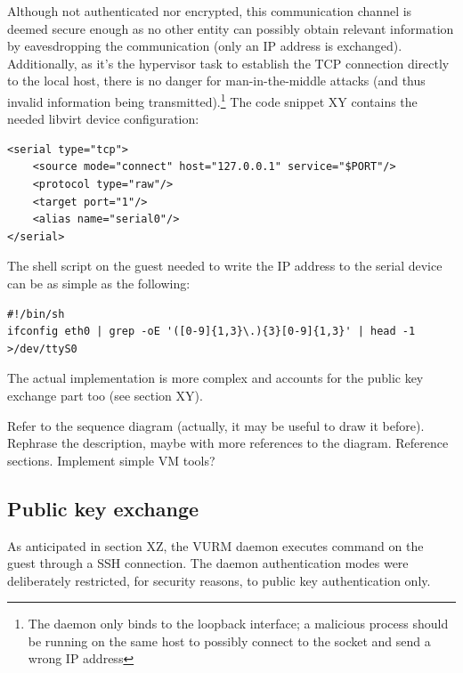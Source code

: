 Although not authenticated nor encrypted, this communication channel is deemed secure enough as no other entity can possibly obtain relevant information by eavesdropping the communication (only an IP address is exchanged). Additionally, as it's the hypervisor task to establish the TCP connection directly to the local host, there is no danger for man-in-the-middle attacks (and thus invalid information being transmitted).\footnote{The daemon only binds to the loopback interface; a malicious process should be running on the same host to possibly connect to the socket and send a wrong IP address}
The code snippet XY contains the needed libvirt device configuration:

\lstset{language=xml,caption=Libvirt TCP to serial port device description,label=lst:serialtcp}
\begin{lstlisting}
<serial type="tcp">
    <source mode="connect" host="127.0.0.1" service="$PORT"/>
    <protocol type="raw"/>
    <target port="1"/>
    <alias name="serial0"/>
</serial>
\end{lstlisting}

The shell script on the guest needed to write the IP address to the serial device can be as simple as the following:

\lstset{language=bash,caption=Shell script to write the IP address to the serial port,label=lst:serialip}
\begin{lstlisting}
#!/bin/sh
ifconfig eth0 | grep -oE '([0-9]{1,3}\.){3}[0-9]{1,3}' | head -1 >/dev/ttyS0
\end{lstlisting}

The actual implementation is more complex and accounts for the public key exchange part too (see section XY).


\begin{todo}
Refer to the sequence diagram (actually, it may be useful to draw it before).
Rephrase the description, maybe with more references to the diagram.
Reference sections.
Implement simple VM tools?
\end{todo}


\subsection{Public key exchange}

As anticipated in section XZ, the VURM daemon executes command on the guest through a SSH connection. The daemon authentication modes were deliberately restricted, for security reasons, to public key authentication only.

